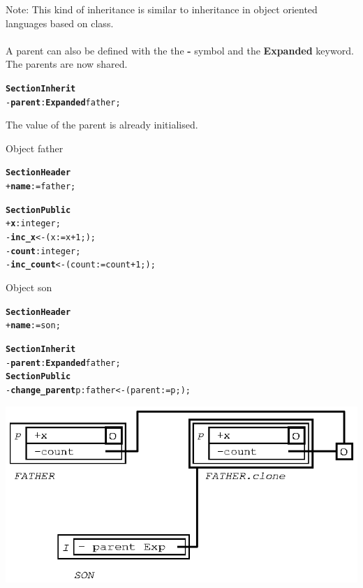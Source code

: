 \documentclass[11pt]{mybook}
\begin{document}
Note: This kind of inheritance is similar to inheritance in object oriented languages based on class.\\
~\\
A parent can also be defined with the the {\bf{} -} symbol and the {\bf{}Expanded} keyword. The parents are now shared.
\begin{alltt}
{\bf{}Section Inherit}
  - {\bf{} parent}:{\bf{}Expanded} {\sc{}father};
\end{alltt}
The value of the parent is already initialised.
\begin{center}
Object {\sc{}father}
\end{center}
\begin{alltt} 
{\bf{}Section Header}
  + {\bf{}name}     := {\sc{}father};          

{\bf{}Section Public}
  + {\bf{}x}    :{\sc{}integer};
  - {\bf{}inc\_x} <- ( x := x + 1; );
  - {\bf{}count}:{\sc{}integer};
  - {\bf{}inc\_count} <- ( count := count + 1; );
\end{alltt}
\begin{center}
Object {\sc{}son}
\end{center}
\begin{alltt} 
{\bf{}Section Header}
  + {\bf{}name}     := {\sc{}son};          

{\bf{}Section Inherit}
  - {\bf{}parent}:{\bf{}Expanded} {\sc{}father};
{\bf{}Section Public}
  - {\bf{}change\_parent} p:{\sc{}father} <- ( parent := p; );
\end{alltt}
\begin{center}
\includegraphics[scale=1.0]{figures/inherit_expanded_minus_0}
\end{center}
\end{document}

